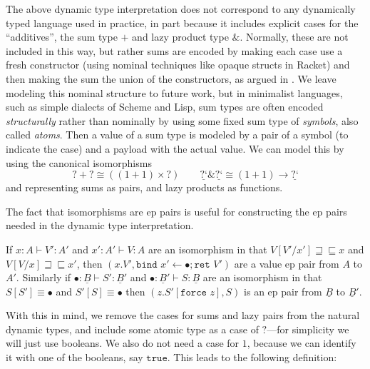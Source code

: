 \documentclass[acmsmall,nonacm]{acmart}
\renewcommand{\u}{\underline}
\newcommand{\ltdyn}{\sqsubseteq}
\newcommand{\gtdyn}{\sqsupseteq}
\newcommand{\equidyn}{\mathrel{\gtdyn\ltdyn}}
\newcommand{\dynv}{{?}}
\newcommand{\dync}{\u {\text{?`}}}
\newcommand{\bindXtoYinZ}[2]{\kw{bind}#2 \leftarrow #1;}
\newcommand{\kw}[1]{\texttt{#1}\,\,}
\newcommand{\ret}{\kw{ret}}
\newcommand{\force}{\kw{force}}
\newcommand{\with}{\mathbin{\&}}
\begin{document}
The above dynamic type interpretation does not correspond to any
dynamically typed language used in practice, in part because it
includes explicit cases for the ``additives'', the sum type $+$ and
lazy product type $\with$.
%
Normally, these are not included in this way, but rather sums are
encoded by making each case use a fresh constructor (using nominal
techniques like opaque structs in Racket) and then making the sum the
union of the constructors, as argued in \citet{siekth16recursiveunion}.
%
We leave modeling this nominal structure to future work, but in
minimalist languages, such as simple dialects of Scheme and Lisp, sum
types are often encoded \emph{structurally} rather than nominally by
using some fixed sum type of \emph{symbols}, also called \emph{atoms}.
%
Then a value of a sum type is modeled by a pair of a symbol (to indicate
the case) and a payload with the actual value.
%
We can model this by using the canonical isomorphisms
\[ \dynv + \dynv \cong ((1+1) \times \dynv) \qquad \dync \with \dync \cong (1+1) \to \dync \]
and representing sums as pairs, and lazy products as functions.
\begin{longonly}
The fact that isomorphisms are ep pairs is useful for constructing the
ep pairs needed in the dynamic type interpretation.  
\begin{lemma}
  \label{lem:isos-are-ep}
  If $x:A \vdash V' : A'$ and $x':A' \vdash V : A$ are an isomorphism in
  that $V[V'/x'] \equidyn x$ and $V[V/x]\equidyn x'$, then $(x.V',
  \bindXtoYinZ \bullet {x'} \ret V')$ are a value ep pair from $A$ to
  $A'$.  Similarly if $\bullet : \u B \vdash S' : \u B'$ and $\bullet :
  \u B' \vdash S : \u B$ are an isomorphism in that $S[S']\equiv
  \bullet$ and $S'[S] \equiv \bullet$ then $(z. S'[\force z], S)$ is an
  ep pair from $\u B$ to $\u B'$.
\end{lemma}
\end{longonly}

With this in mind, we remove the cases for sums and lazy pairs from the
natural dynamic types, and include some atomic type as a case of
$\dynv$---for simplicity we will just use booleans.
%
We also do not need a case for $1$, because we can identify it with one
of the booleans, say $\texttt{true}$.
%
This leads to the following definition:
\end{document}
